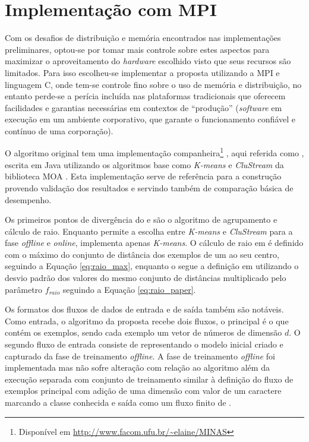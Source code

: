
\section{Implementação com MPI}

Com os desafios de distribuição e memória encontrados nas implementações
preliminares, optou-se por tomar mais controle sobre estes aspectos para
maximizar o aproveitamento do \emph{hardware} escolhido visto que seus recursos
são limitados.
Para isso escolheu-se implementar a proposta utilizando a \acf{MPI} e linguagem C,
onde tem-se controle fino sobre o uso de memória e distribuição, no entanto
perde-se a perícia incluída nas plataformas tradicionais que oferecem
facilidades e garantias necessárias em contextos de ``produção''
(\emph{software} em execução em um ambiente corporativo, que garante o
funcionamento confiável e contínuo de uma corporação).

O algoritmo \minas original \cite{Faria2016minas} tem uma implementação
companheira\footnote{Disponível em \url{http://www.facom.ufu.br/~elaine/MINAS}}
\cite{Faria2013source}, aqui referida como , escrita em Java utilizando
os algoritmos base como \emph{K-means} e \emph{CluStream} da biblioteca MOA
\cite{MOA}.
Esta implementação serve de referência para a construção provendo validação dos
resultados e servindo também de comparação básica de desempenho.

Os primeiros pontos de divergência do \mfog e  são o algoritmo de
agrupamento e cálculo de raio.
Enquanto  permite a escolha entre \emph{K-means} e \emph{CluStream} para a
fase \emph{offline} e \emph{online}, \mfog implementa apenas \emph{K-means}.
O cálculo de raio em  é definido com o máximo do conjunto de distância
dos exemplos de um \mcluster ao seu centro, seguindo a Equação \ref{eq:raio_max},
enquanto o \mfog segue a definição em  utilizando o
desvio padrão dos valores do mesmo conjunto de distâncias multiplicado pelo
parâmetro $f_{raio}$ seguindo a Equação \ref{eq:raio_paper}.

\newcommand{\val}{$\vec{v}\,$\xspace}
Os formatos dos fluxos de dados de entrada e de saída também são notáveis. Como
entrada, o algoritmo da proposta recebe dois fluxos, o principal é o que contém
os exemplos, sendo cada exemplo um vetor de números de dimensão $d$.
O segundo fluxo de entrada consiste de \mclusters representando o modelo inicial
criado e capturado da fase de treinamento \emph{offline}.
A fase de treinamento \emph{offline} foi implementada mas não sofre alteração
com relação ao algoritmo \minas \cite{Faria2016minas} além da execução separada
com conjunto de treinamento similar à definição do fluxo de exemplos principal
com adição de uma dimensão com valor de um caractere marcando a classe conhecida
e saída como um fluxo finito de \mclusters.

